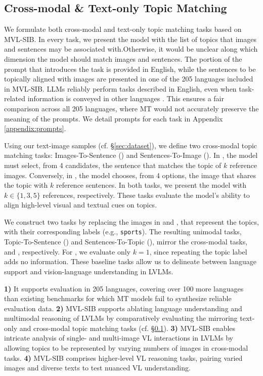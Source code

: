 \subsection{Cross-modal \& Text-only Topic Matching}
\label{sec:tasks}

We formulate both cross-modal and text-only topic matching tasks based on MVL-SIB. In every task, we present the model with the list of topics that images and sentences may be associated with.\footnotemark[\value{footnote}] Otherwise, it would be unclear along which dimension the model should match images and sentences. The portion of the prompt that introduces the task is provided in English, while the sentences to be topically aligned with images are presented in one of the 205 languages included in MVL-SIB. LLMs reliably perform tasks described in English, even when task-related information is conveyed in other languages \cite{muennighoff2022crosslingual,romanou2024include}. This ensures a fair comparison across all 205 languages, where MT would not accurately preserve the meaning of the prompts. We detail prompts for each task in Appendix \ref{appendix:prompts}. 

Using our text-image samples (cf. \S\ref{sec:dataset}), we define two cross-modal topic matching tasks: Images-To-Sentence (\its) and Sentences-To-Image (\sti). In \its, the model must select, from 4 candidates, the sentence that matches the topic of $k$ reference images. Conversely, in \sti, the model chooses, from 4 options, the image that shares the topic with $k$ reference sentences. In both tasks, we present the model with $k \in \{1, 3, 5\}$ references, respectively. These tasks evaluate the model’s ability to align high-level visual and textual cues on topics.

We construct two tasks by replacing the images in \its and \sti, that represent the topics, with their corresponding labels (e.g., \texttt{sports}). The resulting unimodal tasks, Topic-To-Sentence (\tts) and Sentences-To-Topic (\stt), mirror the cross-modal tasks, \its and \sti, respectively. For \tts, we evaluate only $k{=}1$, since repeating the topic label adds no information. These baseline tasks allow us to delineate between language support and vision-language understanding in LVLMs.

 \textbf{1)} It supports evaluation in 205 languages, covering over 100 more languages than existing benchmarks for which MT models fail to synthesize reliable evaluation data. \textbf{2)} MVL-SIB supports ablating language understanding and multimodal reasoning of LVLMs by comparatively evaluating the mirroring text-only and cross-modal topic matching tasks (cf. \S\ref{sec:tasks}). \textbf{3)} MVL-SIB enables intricate analysis of single- and multi-image VL interactions in LVLMs by allowing topics to be represented by varying numbers of images in cross-modal tasks. \textbf{4)} MVL-SIB comprises higher-level VL reasoning tasks,  pairing varied images and diverse texts to test nuanced VL understanding. 